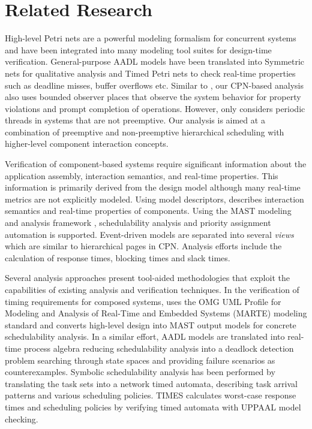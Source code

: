 \section{Related Research}
\label{sec:Related_Research}

High-level Petri nets are a powerful modeling formalism for concurrent systems and have been integrated into many modeling tool suites for design-time verification. General-purpose AADL models have been translated into Symmetric nets for qualitative analysis \cite{kordon_sn} and Timed Petri nets \cite{kordon2009} to check real-time properties such as deadline misses, buffer overflows etc. Similar to \cite{kordon2009}, our CPN-based analysis also uses bounded observer places \cite{Alpern1989} that observe the system behavior for property violations and prompt completion of operations. However, \cite{kordon2009} only considers periodic threads in systems that are not preemptive. Our analysis is aimed at a combination of preemptive and non-preemptive hierarchical scheduling with higher-level component interaction concepts.

Verification of component-based systems require significant information about the application assembly, interaction semantics, and real-time properties. This information is primarily derived from the design model although many real-time metrics are not explicitly modeled. Using model descriptors, \cite{Lopez2006} describes interaction semantics and real-time properties of components. Using the MAST modeling and analysis framework \cite{MAST1, MAST2}, schedulability analysis and priority assignment automation is supported. Event-driven models are separated into several \emph{views} which are similar to hierarchical pages in CPN. Analysis efforts include the calculation of response times, blocking times and slack times. %

Several analysis approaches present tool-aided methodologies that exploit the capabilities of existing analysis and verification techniques. In the verification of timing requirements for composed systems, \cite{medina2011} uses the OMG UML Profile for Modeling and Analysis of Real-Time and Embedded Systems (MARTE) modeling standard and converts high-level design into MAST output models for concrete schedulability analysis. In a similar effort, AADL models are translated into real-time process algebra \cite{sokolsky2006} reducing schedulability analysis into a deadlock detection problem searching through state spaces and providing failure scenarios as counterexamples. Symbolic schedulability analysis has been performed by translating the task sets into a network timed automata, describing task arrival patterns and various scheduling policies. TIMES \cite{TIMES} calculates worst-case response times and scheduling policies by verifying timed automata with UPPAAL \cite{UPPAAL} model checking.

